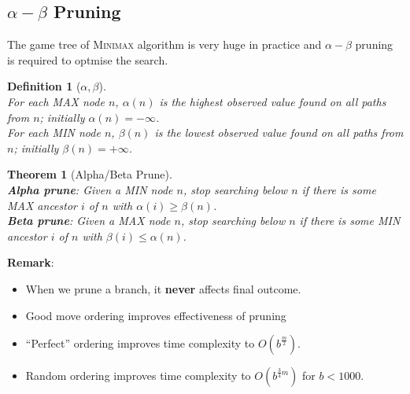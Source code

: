 \documentclass[12pt]{article}
\newtheorem{definition}{Definition}[section]
\newtheorem{theorem}{Theorem}[section]
\theoremstyle{definition}
\begin{document}
\subsection{{$\alpha-\beta$ Pruning}}
The game tree of \textsc{Minimax} algorithm is very huge in practice and $\alpha-\beta$ pruning is required to optmise the search.
\begin{definition}[{$\alpha,\beta$}]
\hfill\\\normalfont For each MAX node $n$, $\alpha(n)$ is the highest observed value found on all paths from $n$; initially $\alpha(n)=-\infty$.\\
For each MIN node $n$, $\beta(n)$ is the lowest observed value found on all paths from $n$; initially $\beta(n)=+\infty$.
\end{definition}
\begin{theorem}[Alpha/Beta Prune]
\hfill\\\normalfont \textbf{Alpha prune}: Given a MIN node $n$, stop searching below $n$ if there is some MAX ancestor $i$ of $n$ with $\alpha(i)\geq \beta(n)$.\\
\textbf{Beta prune}: Given a MAX node $n$, stop searching below $n$ if there is some MIN ancestor $i$ of $n$ with $\beta(i)\leq \alpha(n)$.
\end{theorem}
\textbf{Remark}:\\
\begin{itemize}
	\item When we prune a branch, it \textbf{never} affects final outcome.
	\item Good move ordering improves effectiveness of pruning
	\item ``Perfect'' ordering improves time complexity to $O(b^{\frac{m}{2}})$.
	\item Random ordering improves time complexity to $O(b^{\frac{3}{4}m})$ for $b<1000$.
\end{itemize}
\end{document}
